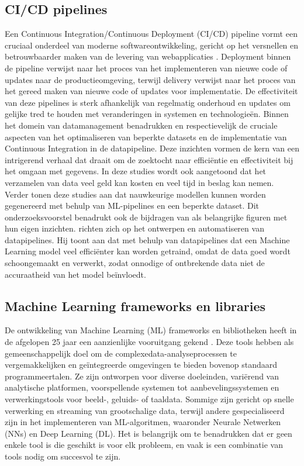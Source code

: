 \subsection{CI/CD pipelines}
Een Continuous Integration/Continuous Deployment (CI/CD) pipeline vormt een cruciaal onderdeel van moderne softwareontwikkeling, gericht op het versnellen en betrouwbaarder maken van de levering van webapplicaties \autocite{Singh2023}. Deployment binnen de pipeline verwijst naar het proces van het implementeren van nieuwe code of updates naar de productieomgeving, terwijl delivery verwijst naar het proces van het gereed maken van nieuwe code of updates voor implementatie. De effectiviteit van deze pipelines is sterk afhankelijk van regelmatig onderhoud en updates om gelijke tred te houden met veranderingen in systemen en technologieën. Binnen het domein van datamanagement benadrukken \textcite{Samad2018} en \textcite{Vadavalasa2020} respectievelijk de cruciale aspecten van het optimaliseren van beperkte datasets en de implementatie van Continuous Integration in de datapipeline. Deze inzichten vormen de kern van een intrigerend verhaal dat draait om de zoektocht naar efficiëntie en effectiviteit bij het omgaan met gegevens. In deze studies wordt ook aangetoond dat het verzamelen van data veel geld kan kosten en veel tijd in beslag kan nemen. Verder tonen deze studies aan dat nauwkeurige modellen kunnen worden gegenereerd met behulp van ML-pipelines en een beperkte dataset. Dit onderzoeksvoorstel benadrukt ook de bijdragen van \textcite{Zhang2022} als belangrijke figuren met hun eigen inzichten.
\textcite{Zhang2022} richten zich op het ontwerpen en automatiseren van datapipelines. Hij toont aan dat met behulp van datapipelines dat een Machine Learning model veel efficiënter kan worden getraind, omdat de data goed wordt schoongemaakt en verwerkt, zodat onnodige of ontbrekende data niet de accuraatheid van het model beïnvloedt.
\subsection{Machine Learning frameworks en libraries}
De ontwikkeling van Machine Learning (ML) frameworks en bibliotheken heeft in de afgelopen 25 jaar een aanzienlijke vooruitgang gekend \autocite{Nguyen2019}. Deze tools hebben als gemeenschappelijk doel om de complexe\newline data-analyseprocessen te vergemakkelijken en geïntegreerde omgevingen te bieden bovenop standaard programmeertalen. Ze zijn ontworpen voor diverse doeleinden, variërend van analytische platformen, voorspellende systemen tot aanbevelingssystemen en verwerkingstools voor beeld-, geluids- of taaldata. Sommige zijn gericht op snelle verwerking en streaming van grootschalige data, terwijl andere gespecialiseerd zijn in het implementeren van ML-algoritmen, waaronder Neurale Netwerken (NNs) en Deep Learning (DL). Het is belangrijk om te benadrukken dat er geen enkele tool is die geschikt is voor elk probleem, en vaak is een combinatie van tools nodig om succesvol te zijn.

